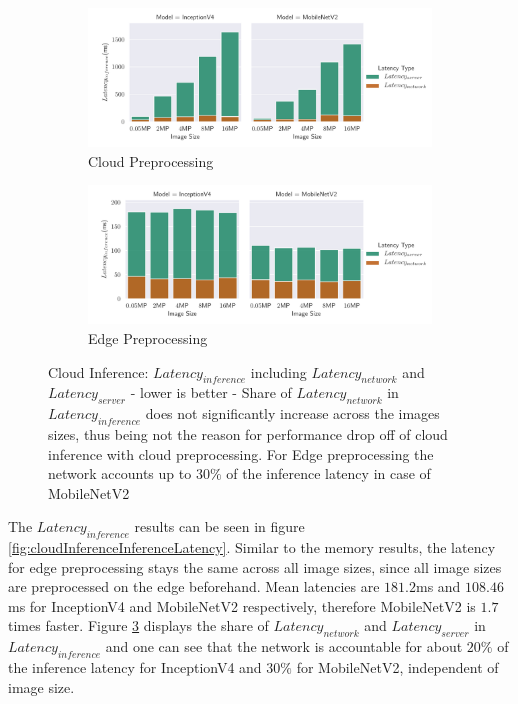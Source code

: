 \begin{figure}[!htb]
\centering
\begin{subfigure}[b]{0.95\textwidth}
   \includegraphics[width=1\linewidth]{./Bilder/single_plots/cloud_inference_plots/Cloud_Server_+_NetworkLatencies_cloudprepro.pdf}
   \caption{Cloud Preprocessing}
   \label{fig:CloudInferenceratioCloudtotal} 
\end{subfigure}

\begin{subfigure}[b]{0.95\textwidth}
   \includegraphics[width=1\linewidth]{./Bilder/single_plots/cloud_inference_plots/Cloud_Server_+_NetworkLatencies_edgeprepro.pdf}
   \caption{Edge Preprocessing}
   \label{fig:CloudInferenceRatioEdgetotal}
\end{subfigure}

\caption[Cloud Inference:  Share of $Latency_{network}$ and $Latency_{server}$ - lower is better]{Cloud Inference:  $Latency_{inference}$ including $Latency_{network}$ and $Latency_{server}$ - lower is better - 
Share of $Latency_{network}$ in $Latency_{inference}$ does not significantly increase across the images sizes, thus being not the reason for performance drop off of cloud inference with cloud preprocessing. For Edge preprocessing the network accounts up to $30\%$ of the inference latency in case of MobileNetV2}
\end{figure}

The $Latency_{inference}$ results can be seen in figure \ref{fig:cloudInferenceInferenceLatency}.
Similar to the memory results, the latency for edge preprocessing stays the same across all image sizes, since all image sizes are preprocessed on the edge beforehand. 
Mean latencies are $181.2$ms and $108.46$ms for InceptionV4 and MobileNetV2 respectively, therefore MobileNetV2 is $1.7$ times faster.
Figure \ref{fig:CloudInferenceRatioEdgetotal} displays the share of $Latency_{network}$ and $Latency_{server}$ in $Latency_{inference}$ and one can see that the network is accountable for about $20\%$ of the  inference latency for InceptionV4 and $30\%$ for MobileNetV2, independent of image size.

